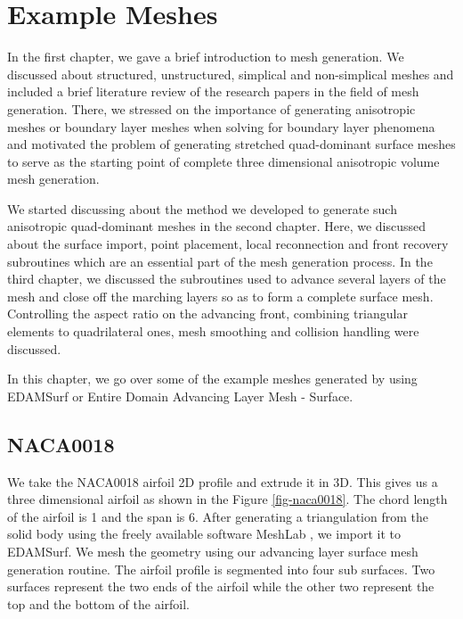 \chapter{Example Meshes}

In the first chapter, we gave a brief introduction to mesh generation. We discussed about structured, unstructured, simplical and non-simplical meshes and included a brief literature review of the research papers in the field of mesh generation. There, we stressed on the importance of generating anisotropic meshes or boundary layer meshes when solving for boundary layer phenomena and motivated the problem of generating stretched quad-dominant surface meshes to serve as the starting point of complete three dimensional anisotropic volume mesh generation.

We started discussing about the method we developed to generate such anisotropic quad-dominant meshes in the second chapter. Here, we discussed about the surface import, point placement, local reconnection and front recovery subroutines which are an essential part of the mesh generation process. In the third chapter, we discussed the subroutines used to advance several layers of the mesh and close off the marching layers so as to form a complete surface mesh. Controlling the aspect ratio on the advancing front, combining triangular elements to quadrilateral ones, mesh smoothing and collision handling were discussed.

In this chapter, we go over some of the example meshes generated by using EDAMSurf or Entire Domain Advancing Layer Mesh - Surface.

\section{NACA0018}

We take the NACA0018 airfoil 2D profile and extrude it in 3D. This gives us a three dimensional airfoil as shown in the Figure \ref{fig-naca0018}. The chord length of the airfoil is 1 and the span is 6. After generating a triangulation from the solid body using the freely available software MeshLab \cite{LocalChapterEvents:ItalChap:ItalianChapConf2008:129-136}, we import it to EDAMSurf. We mesh the geometry using our advancing layer surface mesh generation routine. The airfoil profile is segmented into four sub surfaces. Two surfaces represent the two ends of the airfoil while the other two represent the top and the bottom of the airfoil.

